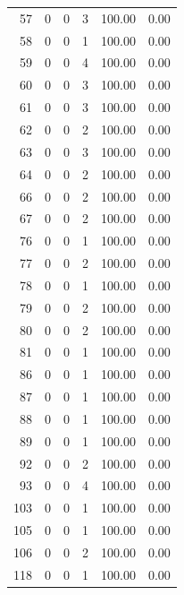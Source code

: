 \documentclass[11pt]{article}
\begin{document}
\begin{longtable}{r|r|r|r|r|r}
    57    & 0     & 0     & 3     & 100.00 & 0.00 \\
    58    & 0     & 0     & 1     & 100.00 & 0.00 \\
    59    & 0     & 0     & 4     & 100.00 & 0.00 \\
    60    & 0     & 0     & 3     & 100.00 & 0.00 \\
    61    & 0     & 0     & 3     & 100.00 & 0.00 \\
    62    & 0     & 0     & 2     & 100.00 & 0.00 \\
    63    & 0     & 0     & 3     & 100.00 & 0.00 \\
    64    & 0     & 0     & 2     & 100.00 & 0.00 \\
    66    & 0     & 0     & 2     & 100.00 & 0.00 \\
    67    & 0     & 0     & 2     & 100.00 & 0.00 \\
    76    & 0     & 0     & 1     & 100.00 & 0.00 \\
    77    & 0     & 0     & 2     & 100.00 & 0.00 \\
    78    & 0     & 0     & 1     & 100.00 & 0.00 \\
    79    & 0     & 0     & 2     & 100.00 & 0.00 \\
    80    & 0     & 0     & 2     & 100.00 & 0.00 \\
    81    & 0     & 0     & 1     & 100.00 & 0.00 \\
    86    & 0     & 0     & 1     & 100.00 & 0.00 \\
    87    & 0     & 0     & 1     & 100.00 & 0.00 \\
    88    & 0     & 0     & 1     & 100.00 & 0.00 \\
    89    & 0     & 0     & 1     & 100.00 & 0.00 \\
    92    & 0     & 0     & 2     & 100.00 & 0.00 \\
    93    & 0     & 0     & 4     & 100.00 & 0.00 \\
    103   & 0     & 0     & 1     & 100.00 & 0.00 \\
    105   & 0     & 0     & 1     & 100.00 & 0.00 \\
    106   & 0     & 0     & 2     & 100.00 & 0.00 \\
    118   & 0     & 0     & 1     & 100.00 & 0.00 \\
    \bottomrule
\end{longtable}



\end{document}

